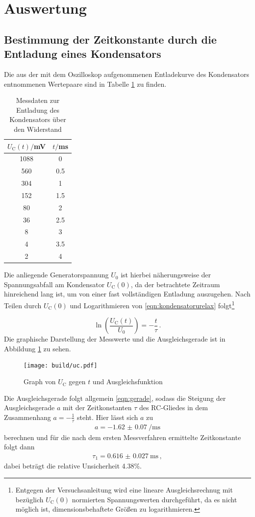 \section{Auswertung}
\label{sec:Auswertung}
\subsection{Bestimmung der Zeitkonstante durch die Entladung eines Kondensators}
Die aus der mit dem Oszilloskop aufgenommenen Entladekurve des Kondensators
entnommenen Wertepaare sind in Tabelle \ref{tab:entladung} zu finden.

\begin{table}
\centering
\caption{Messdaten zur Entladung des Kondensators über den Widerstand}
\label{tab:entladung}
\begin{tabular}{c c}
\toprule
$U_\text{C}(t)/$mV & $t/$ms \\
\midrule
1088 &  0   \\
 560 &  0.5 \\
 304 &  1   \\
 152 &  1.5 \\
 80  &  2   \\
 36  &  2.5 \\
  8  &  3   \\
  4  &  3.5 \\
  2  &  4   \\
\bottomrule
\end{tabular}
\end{table}
Die anliegende Generatorspannung $U_0$ ist hierbei näherungsweise der Spannungsabfall
am Kondensator $U_\text{C}(0)$, da der betrachtete Zeitraum hinreichend lang ist, um von einer
fast vollständigen Entladung auszugehen.
Nach Teilen durch $U_\text{C}(0)$ und Logarithmieren von \eqref{eqn:kondensatorurelax}
folgt\footnote{Entgegen der Versuchsanleitung wird eine lineare Ausgleichsrechnug mit bezüglich
$U_\text{C}(0)$ normierten Spannungswerten durchgeführt, da es nicht möglich ist,
dimensionsbehaftete Größen zu logarithmieren.}

\begin{equation}
  \ln{\left(\frac{U_\mathrm{C}(t)}{U_0}\right)} = -\frac{t}{\tau}\,.
\end{equation}
Die graphische Darstellung der Messwerte und die Ausgleichsgerade ist in Abbildung \ref{fig:entladung}
zu sehen.
\begin{figure}
  \centering
  \texttt{[image: build/uc.pdf]}
  \caption{Graph von $U_\text{C}$ gegen $t$ und Ausgleichsfunktion}
  \label{fig:entladung}
\end{figure}
Die Ausgleichsgerade folgt allgemein \eqref{eqn:gerade}, sodass die Steigung der
Ausgleichsgerade $a$ mit der Zeitkonstanten $\tau$ des RC-Gliedes in dem Zusammenhang
$a = -\frac{1}{\tau}$ steht. Hier lässt sich $a$ zu
\begin{align}
  a = \SI{-1.62(007)}{\per\milli\second}
\end{align}
berechnen und für die nach dem ersten Messverfahren ermittelte Zeitkonstante folgt dann
\begin{align}
\tau_1 = \SI{0.616(0027)}{\milli\second}\,,
\end{align}
dabei beträgt die relative Unsicherheit 4.38\%.
